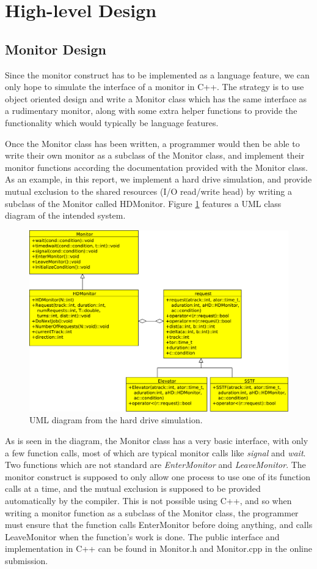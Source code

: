 \documentclass[12pt]{report}
\begin{document}
\section{High-level Design} %
\subsection{Monitor Design}
Since the monitor construct has to be implemented as a language feature, we can only hope to
simulate the interface of a monitor in C++. The strategy is to use object oriented design
and write a Monitor class which has the same interface as a rudimentary monitor, along
with some extra helper functions to provide the functionality which would typically be
language features. 

Once the Monitor class has been written, a programmer would then be able to write their
own monitor as a subclass of the Monitor class, and implement their monitor functions
according the documentation provided with the Monitor class. As an example, in this
report, we implement a hard drive simulation, and provide mutual exclusion to the shared
resources (I/O read/write head) by writing a subclass of the Monitor called HDMonitor.
Figure \ref{fig:UML} features a UML class diagram of the intended system.
\begin{figure}[htb!]
    \centering
    \includegraphics[scale=0.5]{300UML.pdf}
    \caption{UML diagram from the hard drive simulation.}
    \label{fig:UML}
\end{figure}

As is seen in the diagram, the Monitor class has a very basic interface, with only a few
function calls, most of which are typical monitor calls like \emph{signal} and
\emph{wait}. Two functions which are not standard are \emph{EnterMonitor} and
\emph{LeaveMonitor}. The monitor construct is supposed to only allow one process to use
one of its function calls at a time, and the mutual exclusion is supposed to be provided
automatically by the compiler. This is not possible using C++, and so when writing a
monitor function as a subclass of the Monitor class, the programmer must ensure that the
function calls EnterMonitor before doing anything, and calls LeaveMonitor when the
function's work is done. The public interface and implementation in C++ can be found in Monitor.h and Monitor.cpp in the online submission.
\end{document}

